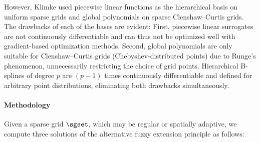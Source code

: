 However, Klimke used piecewise linear functions as the hierarchical basis on
uniform sparse grids and global polynomials on sparse Clenshaw--Curtis grids.
The drawbacks of each of the bases are evident:
First, piecewise linear surrogates are not continuously differentiable and
can thus not be optimized well with gradient-based optimization methods.
Second, global polynomials are only suitable for
Clenshaw--Curtis grids (Chebyshev-distributed points)
due to Runge's phenomenon,
unnecessarily restricting the choice of grid points.
Hierarchical B-splines of degree $p$ are $(p - 1)$ times
continuously differentiable and defined for arbitrary point
distributions, eliminating both drawbacks simultaneously.

\paragraph{Methodology}

Given a sparse grid $\sgset$, which may be regular or spatially adaptive,
we compute three solutions of the alternative fuzzy extension principle
as follows:


